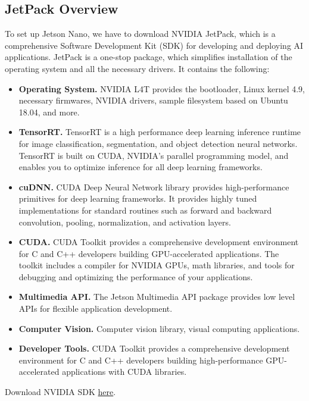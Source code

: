 \documentclass[letter, 12pt]{article}
\begin{document}
	\subsection{JetPack Overview} \label{jetPackOverview}
	\noindent To set up Jetson Nano, we have to download NVIDIA JetPack, which is a comprehensive Software Development Kit (SDK) for developing and deploying AI applications. JetPack is a one-stop package, which simplifies installation of the operating system and all the necessary drivers. It contains the following:
	\begin{itemize}
		\item \textbf{Operating System.} NVIDIA L4T provides the bootloader, Linux kernel 4.9, necessary firmwares, NVIDIA drivers, sample filesystem based on Ubuntu 18.04, and more.
		
		\item \textbf{TensorRT.} TensorRT is a high performance deep learning inference runtime for image classification, segmentation, and object detection neural networks. TensorRT is built on CUDA, NVIDIA’s parallel programming model, and enables you to optimize inference for all deep learning frameworks.
		
		\item \textbf{cuDNN.} CUDA Deep Neural Network library provides high-performance primitives for deep learning frameworks. It provides highly tuned implementations for standard routines such as forward and backward convolution, pooling, normalization, and activation layers.
		
		\item \textbf{CUDA.} CUDA Toolkit provides a comprehensive development environment for C and C++ developers building GPU-accelerated applications. The toolkit includes a compiler for NVIDIA GPUs, math libraries, and tools for debugging and optimizing the performance of your applications.
		
		\item \textbf{Multimedia API.} The Jetson Multimedia API package provides low level APIs for flexible application development.
		
		\item \textbf{Computer Vision.} Computer vision library, visual computing applications.
		
		\item \textbf{Developer Tools.} CUDA Toolkit provides a comprehensive development environment for C and C++ developers building high-performance GPU-accelerated applications with CUDA libraries.
	\end{itemize}
	\noindent Download NVIDIA SDK \href{https://developer.nvidia.com/jetson-nano-sd-card-image}{here}.
	
\end{document}
